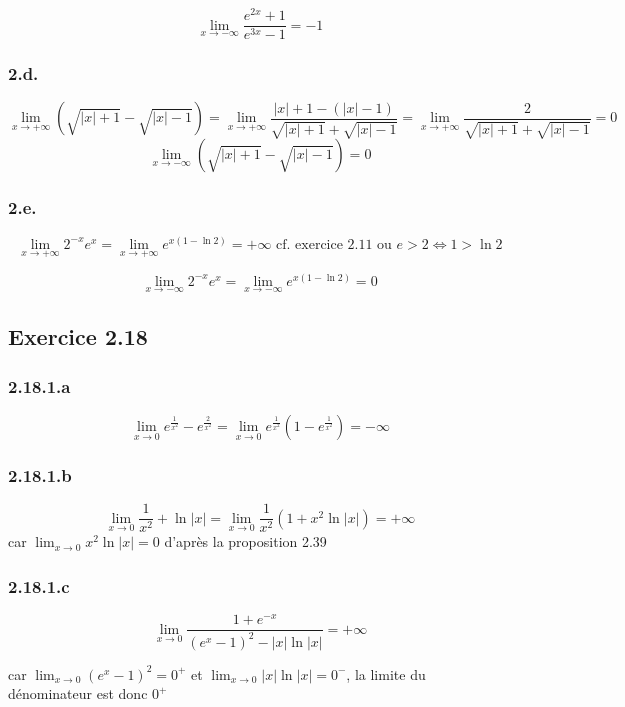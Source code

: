 \documentclass{report}
\begin{document}
\begin{displaymath}
	\lim_{x \rightarrow -\infty} \frac{e^{2x}+1}{e^{3x}-1} = -1
\end{displaymath}


\subsubsection*{2.d.}
\begin{displaymath}
	\lim_{x \rightarrow +\infty} \left( \sqrt{|x|+1} - \sqrt{|x|-1} \right)
		= \lim_{x \rightarrow +\infty} \frac{|x|+1-(|x|-1)}{\sqrt{|x|+1} + \sqrt{|x|-1}} = \lim_{x \rightarrow +\infty} \frac{2}{\sqrt{|x|+1} + \sqrt{|x|-1}} = 0
\end{displaymath}
\begin{displaymath}
	\lim_{x \rightarrow -\infty} \left( \sqrt{|x|+1} - \sqrt{|x|-1} \right) = 0
\end{displaymath}

\subsubsection*{2.e.}
\begin{displaymath}
	\lim_{x \rightarrow +\infty} 2^{-x}e^x = \lim_{x \rightarrow +\infty} e^{x(1-\ln 2)} = +\infty \text{ cf. exercice 2.11 ou } e>2 \Longleftrightarrow 1 > \ln 2
\end{displaymath}

\begin{displaymath}
	\lim_{x \rightarrow -\infty} 2^{-x}e^x = \lim_{x \rightarrow -\infty} e^{x(1-\ln 2)} = 0^{}
\end{displaymath}


\subsection*{Exercice 2.18}

\subsubsection*{2.18.1.a}
\begin{displaymath}
	\lim_{x \rightarrow 0} e^{\frac{1}{x^2}} - e^{\frac{2}{x^2}}  = \lim_{x \rightarrow 0} e^{\frac{1}{x^2}}(1 - e^{\frac{1}{x^2}}) = -\infty
\end{displaymath}

\subsubsection*{2.18.1.b}
\begin{displaymath}
	\lim_{x \rightarrow 0} \frac{1}{x^2}  + \ln |x| = \lim_{x \rightarrow 0} \frac{1}{x^2}  (1+ x^2\ln |x|) = +\infty
\end{displaymath}
car $ \lim_{x \rightarrow 0} x^2\ln |x| = 0$ d'après la proposition 2.39

\subsubsection*{2.18.1.c}
\begin{displaymath}
	\lim_{x \rightarrow 0} \frac{1+e^{-x}}{(e^x-1)^2 - |x|\ln |x|} = + \infty
\end{displaymath}

car $ \lim_{x \rightarrow 0} (e^x-1)^2 = 0^{+}$ et $ \lim_{x \rightarrow 0} |x|\ln |x| = 0^{-}$, la limite du dénominateur est donc $0^{+}$
\end{document}
